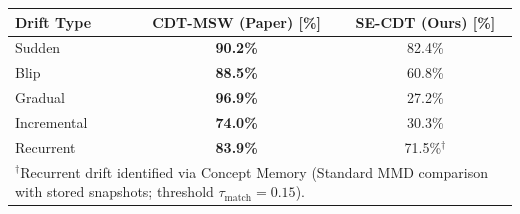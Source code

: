 \begin{tabular}{|l|c|c|}
\hline
\textbf{Drift Type} & \textbf{CDT-MSW (Paper) [\%]} & \textbf{SE-CDT (Ours) [\%]} \\
\hline
Sudden & \textbf{90.2\%} & 82.4\% \\
Blip & \textbf{88.5\%} & 60.8\% \\
Gradual & \textbf{96.9\%} & 27.2\% \\
Incremental & \textbf{74.0\%} & 30.3\% \\
Recurrent & \textbf{83.9\%} & 71.5\%$^\dagger$ \\
\hline
\multicolumn{3}{|l|}{\footnotesize $^\dagger$Recurrent drift identified via Concept Memory (Standard MMD comparison with stored snapshots; threshold $\tau_{\text{match}} = 0.15$).} \\
\hline
\end{tabular}